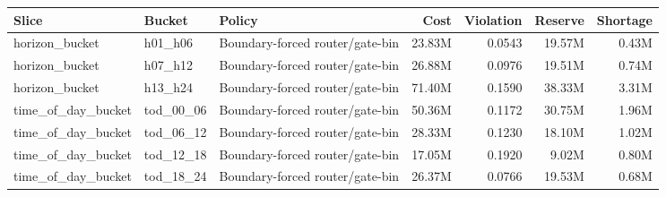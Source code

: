\begin{tabular}{lllrrrr}
\toprule
Slice & Bucket & Policy & Cost & Violation & Reserve & Shortage \\
\midrule
horizon\_bucket & h01\_h06 & Boundary-forced router/gate-bin & 23.83M & 0.0543 & 19.57M & 0.43M \\
horizon\_bucket & h07\_h12 & Boundary-forced router/gate-bin & 26.88M & 0.0976 & 19.51M & 0.74M \\
horizon\_bucket & h13\_h24 & Boundary-forced router/gate-bin & 71.40M & 0.1590 & 38.33M & 3.31M \\
time\_of\_day\_bucket & tod\_00\_06 & Boundary-forced router/gate-bin & 50.36M & 0.1172 & 30.75M & 1.96M \\
time\_of\_day\_bucket & tod\_06\_12 & Boundary-forced router/gate-bin & 28.33M & 0.1230 & 18.10M & 1.02M \\
time\_of\_day\_bucket & tod\_12\_18 & Boundary-forced router/gate-bin & 17.05M & 0.1920 & 9.02M & 0.80M \\
time\_of\_day\_bucket & tod\_18\_24 & Boundary-forced router/gate-bin & 26.37M & 0.0766 & 19.53M & 0.68M \\
\bottomrule
\end{tabular}
